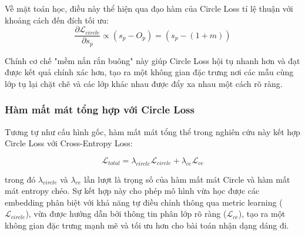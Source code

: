 Về mặt toán học, điều này thể hiện qua đạo hàm của Circle Loss tỉ lệ thuận với khoảng cách đến đích tối ưu:
\begin{equation}
  \frac{\partial \mathcal{L}_{circle}}{\partial s_p} \propto (s_p - O_p) = (s_p - (1+m))
\end{equation}

Chính cơ chế "mềm nắn rắn buông" này giúp Circle Loss hội tụ nhanh hơn và đạt được kết quả chính xác hơn, tạo ra một không gian đặc trưng nơi các mẫu cùng lớp tụ lại chặt chẽ và các lớp khác nhau được đẩy xa nhau một cách rõ ràng.

\subsubsection{Hàm mất mát tổng hợp với Circle Loss}

Tương tự như cấu hình gốc, hàm mất mát tổng thể trong nghiên cứu này kết hợp Circle Loss với Cross-Entropy Loss:

\begin{equation}
  \mathcal{L}_{total} = \lambda_{circle} \mathcal{L}_{circle} + \lambda_{ce} \mathcal{L}_{ce}
  \label{eq:total_loss_circle}
\end{equation}

\noindent trong đó $\lambda_{circle}$ và $\lambda_{ce}$ lần lượt là trọng số của hàm mất mát Circle và hàm mất mát entropy chéo. Sự kết hợp này cho phép mô hình vừa học được các embedding phân biệt với khả năng tự điều chỉnh thông qua metric learning ($\mathcal{L}_{circle}$), vừa được hướng dẫn bởi thông tin phân lớp rõ ràng ($\mathcal{L}_{ce}$), tạo ra một không gian đặc trưng mạnh mẽ và tối ưu hơn cho bài toán nhận dạng dáng đi.